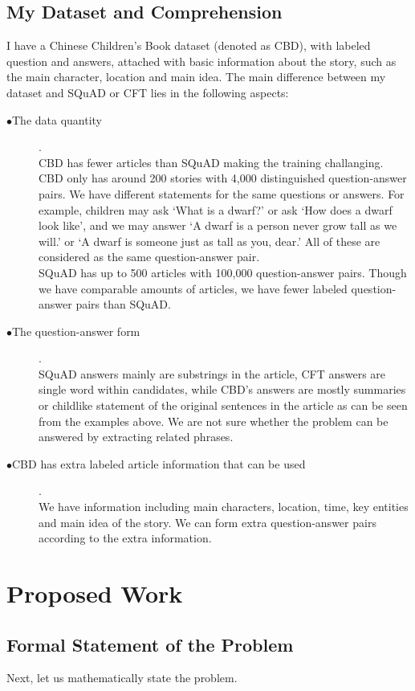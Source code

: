 \documentclass{article}
\begin{document}
\subsection{My Dataset and Comprehension}
I have a Chinese Children's Book dataset (denoted as CBD), with labeled question and answers, attached with basic information about the story, such as the main character, location and main idea. The main difference between my dataset and SQuAD or CFT lies in the following aspects:\\

\begin{description}
\item [$\bullet$The data quantity].\\
CBD has fewer articles than SQuAD making the training challanging.
CBD only has around 200 stories with 4,000 distinguished question-answer pairs. We have different statements for the same questions or answers. For example, children may ask `What is a dwarf?' or ask `How does a dwarf look like', and we may answer `A dwarf is a person never grow tall as we will.' or `A dwarf is someone just as tall as you, dear.' All of these are considered as the same question-answer pair.\\
SQuAD has up to 500 articles with 100,000 question-answer pairs. Though we have comparable amounts of articles, we have fewer labeled question-answer pairs than SQuAD.\\
\item [$\bullet$The question-answer form].\\
SQuAD answers mainly are substrings in the article, CFT answers are single word within candidates, while CBD's answers are mostly summaries or childlike statement of the original sentences in the article as can be seen from the examples above. We are not sure whether the problem can be answered by extracting related phrases.\\
\item [$\bullet$CBD has extra labeled article information that can be used].\\
We have information including main characters, location, time, key entities and main idea of the story. We can form extra question-answer pairs according to the extra information.
\end{description}
\section{Proposed Work}
\subsection{Formal Statement of the Problem}
Next, let us mathematically state the problem. 
\end{document}

